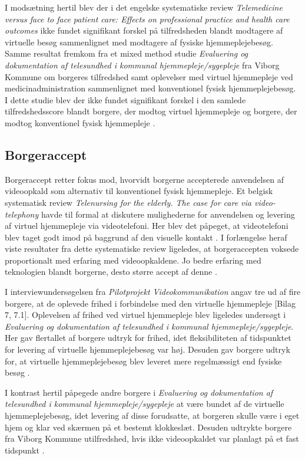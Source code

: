 I modsætning hertil blev der i det engelske systematiske review \textit{Telemedicine versus face to face patient care: Effects on professional practice and health care outcomes} ikke fundet signifikant forskel på tilfredsheden blandt modtagere af virtuelle besøg sammenlignet med modtagere af fysiske hjemmeplejebesøg\cite{Paf2}. 
\\Samme resultat fremkom fra et mixed method studie \textit{Evaluering og dokumentation af telesundhed i kommunal hjemmepleje/sygepleje} fra Viborg Kommune om borgeres tilfredshed samt oplevelser med virtuel hjemmepleje ved medicinadministration sammenlignet med konventionel fysisk hjemmeplejebesøg. I dette studie blev der ikke fundet signifikant forskel i den samlede tilfredshedsscore blandt borgere, der modtog virtuel hjemmepleje og borgere, der modtog konventionel fysisk hjemmepleje \cite{kandidat}.

\subsection{Borgeraccept}
Borgeraccept retter fokus mod, hvorvidt borgerne accepterede anvendelsen af videoopkald som alternativ til konventionel fysisk hjemmepleje. Et belgisk systematisk review \textit{Telenursing for the elderly. The case for care via video-telephony} havde til formal at diskutere mulighederne for anvendelsen og levering af virtuel hjemmepleje via videotelefoni. Her blev det påpeget, at videotelefoni blev taget godt imod på baggrund af den visuelle kontakt \cite{telenursing}. I forlængelse heraf viste resultater fra dette systematiske review ligeledes, at borgeraccepten voksede proportionalt med erfaring med videoopkaldene. Jo bedre erfaring med teknologien blandt borgerne, desto større accept af denne \cite{telenursing}.

I interviewundersøgelsen fra \textit{Pilotprojekt Videokommunikation} angav tre ud af fire borgere, at de oplevede frihed i forbindelse med den virtuelle hjemmepleje [Bilag 7, 7.1]. Oplevelsen af frihed ved virtuel hjemmepleje blev ligeledes undersøgt i \textit{Evaluering og dokumentation af telesundhed i kommunal hjemmepleje/sygepleje}. Her gav flertallet af borgere udtryk for frihed, idet fleksibiliteten af tidspunktet for levering af virtuelle hjemmeplejebesøg var høj. Desuden gav borgere udtryk for, at virtuelle hjemmeplejebesøg blev leveret mere regelmæssigt end fysiske besøg \cite{kandidat}.
 
I kontrast hertil påpegede andre borgere i \textit{Evaluering og dokumentation af telesundhed i kommunal hjemmepleje/sygepleje} at være bundet af de virtuelle hjemmeplejebesøg, idet levering af disse forudsatte, at borgeren skulle være i eget hjem og klar ved skærmen på et bestemt klokkeslæt. Desuden udtrykte borgere fra Viborg Kommune utilfredshed, hvis ikke videoopkaldet var planlagt på et fast tidspunkt \cite{kandidat}.
 

